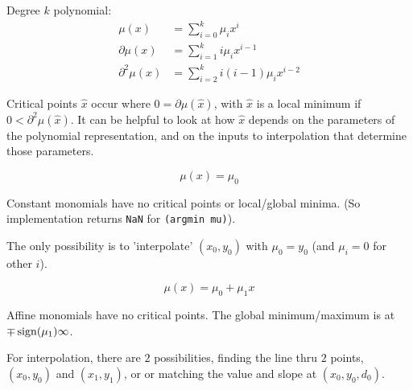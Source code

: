 
Degree $k$ polynomial:
\begin{align}
\mu(x) & = \sum_{i=0}^{k} \mu_i x^i
\\
\partial{\mu}(x) & = \sum_{i=1}^{k} i \mu_i x^{i-1}
\nonumber
\\
\partial^2{\mu}(x) & = \sum_{i=2}^{k} i (i-1) \mu_i x^{i-2}
\nonumber
\end{align}

Critical points $\hat{x}$ occur where 
$ 0 = \partial{\mu}(\hat{x}) $,
with $\hat{x}$ is a local minimum if 
$ 0 < \partial^2{\mu}(\hat{x}) $.
It can be helpful to look at how $\hat{x}$ depends
on the parameters of the polynomial representation,
and on the inputs to interpolation that determine those 
parameters.


\begin{equation}
\mu(x) = \mu_0
\end{equation}

Constant monomials have no critical points or local/global
minima. 
(So implementation returns \texttt{NaN} for \texttt{(argmin mu)}).

The only possibility is to 'interpolate' $(x_0,y_0)$ with
$\mu_0 = y_0$ (and $\mu_i = 0$ for other $i$). 


\begin{equation}
\mu(x) = \mu_0 + \mu_1 x
\end{equation}

Affine monomials have no critical points.
The global minimum/maximum is at $\mp \operatorname*{sign}(\mu_1) \infty$.

For interpolation, there are $2$ possibilities, finding the line thru $2$
points, $(x_0,y_0)$ and $(x_1,y_1)$, or or matching the value and slope at
$(x_0,y_0,d_0)$.







